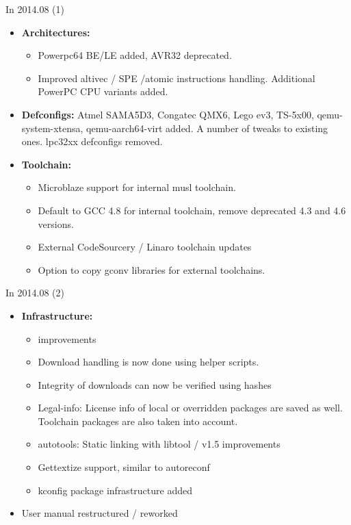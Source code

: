 \begin{frame}{In 2014.08 (1)}
  \begin{itemize}
  \item {\bf Architectures:}
    \begin{itemize}
    \item Powerpc64 BE/LE added, AVR32 deprecated.
    \item Improved altivec / SPE /atomic instructions
      handling. Additional PowerPC CPU variants added.
    \end{itemize}
  \item {\bf Defconfigs:} Atmel SAMA5D3, Congatec QMX6, Lego ev3,
    TS-5x00, qemu-system-xtensa, qemu-aarch64-virt added. A number
    of tweaks to existing ones. lpc32xx defconfigs removed.
  \item {\bf Toolchain:}
    \begin{itemize}
    \item Microblaze support for internal musl toolchain.
    \item Default to GCC 4.8 for internal toolchain, remove deprecated
      4.3 and 4.6 versions.
    \item External CodeSourcery / Linaro toolchain updates
    \item Option to copy gconv libraries for external toolchains.
    \end{itemize}
  \end{itemize}
\end{frame}

\begin{frame}{In 2014.08 (2)}
  \begin{itemize}
  \item {\bf Infrastructure:}
    \begin{itemize}
    \item {} improvements
    \item Download handling is now done using helper scripts.
    \item Integrity of downloads can now be verified using hashes
    \item Legal-info: License info of local or overridden packages
      are saved as well. Toolchain packages are also taken into
      account.
    \item autotools: Static linking with libtool / v1.5 improvements
    \item Gettextize support, similar to autoreconf
    \item kconfig package infrastructure added
    \end{itemize}
  \item User manual restructured / reworked
  \end{itemize}
\end{frame}


